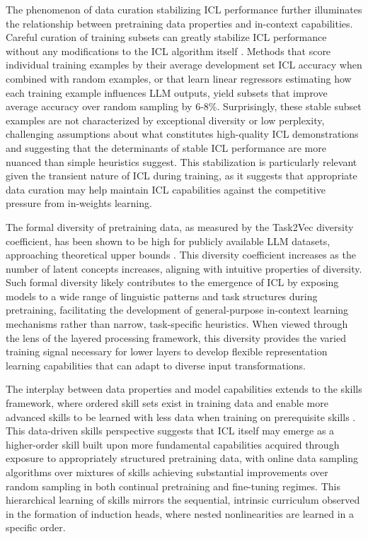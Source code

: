 \documentclass[11pt]{article}
\begin{document}
The phenomenon of data curation stabilizing ICL performance further illuminates the relationship between pretraining data properties and in-context capabilities. Careful curation of training subsets can greatly stabilize ICL performance without any modifications to the ICL algorithm itself \cite{ref34}. Methods that score individual training examples by their average development set ICL accuracy when combined with random examples, or that learn linear regressors estimating how each training example influences LLM outputs, yield subsets that improve average accuracy over random sampling by 6-8\%. Surprisingly, these stable subset examples are not characterized by exceptional diversity or low perplexity, challenging assumptions about what constitutes high-quality ICL demonstrations and suggesting that the determinants of stable ICL performance are more nuanced than simple heuristics suggest. This stabilization is particularly relevant given the transient nature of ICL during training, as it suggests that appropriate data curation may help maintain ICL capabilities against the competitive pressure from in-weights learning.

The formal diversity of pretraining data, as measured by the Task2Vec diversity coefficient, has been shown to be high for publicly available LLM datasets, approaching theoretical upper bounds \cite{ref70}. This diversity coefficient increases as the number of latent concepts increases, aligning with intuitive properties of diversity. Such formal diversity likely contributes to the emergence of ICL by exposing models to a wide range of linguistic patterns and task structures during pretraining, facilitating the development of general-purpose in-context learning mechanisms rather than narrow, task-specific heuristics. When viewed through the lens of the layered processing framework, this diversity provides the varied training signal necessary for lower layers to develop flexible representation learning capabilities that can adapt to diverse input transformations.

The interplay between data properties and model capabilities extends to the skills framework, where ordered skill sets exist in training data and enable more advanced skills to be learned with less data when training on prerequisite skills \cite{ref71}. This data-driven skills perspective suggests that ICL itself may emerge as a higher-order skill built upon more fundamental capabilities acquired through exposure to appropriately structured pretraining data, with online data sampling algorithms over mixtures of skills achieving substantial improvements over random sampling in both continual pretraining and fine-tuning regimes. This hierarchical learning of skills mirrors the sequential, intrinsic curriculum observed in the formation of induction heads, where nested nonlinearities are learned in a specific order.
\end{document}

